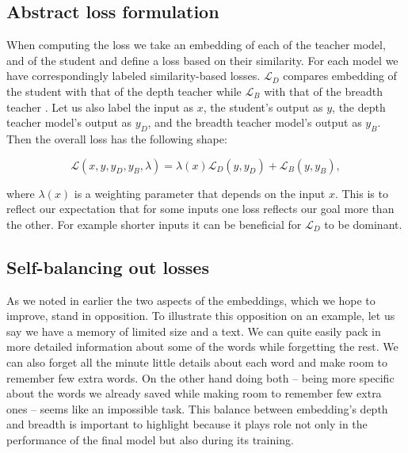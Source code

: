 \subsection{Abstract loss formulation}


When computing the loss we take an embedding of each of the teacher model, and
of the student and define a loss based on their similarity. For each model we
have correspondingly labeled similarity-based losses. $\mathcal{L}_D$ compares
embedding of the student with that of the depth teacher {\Md} while
$\mathcal{L}_B$ with that of the breadth teacher {\Mb}. Let us also label the
input as $x$, the student's output as $y$, the depth teacher model's output as
$y_D$, and the breadth teacher model's output as $y_B$. Then the overall loss
has the following shape:

\begin{equation}
  \mathcal{L}(x, y, y_D, y_B, \lambda) =
    \lambda(x) \mathcal{L}_D(y, y_D) +
            \mathcal{L}_B(y, y_B),
\end{equation}

where $\lambda(x)$ is a weighting parameter that depends on the input $x$. This
is to reflect our expectation that for some inputs one loss reflects our goal
more than the other. For example shorter inputs it can be beneficial for
$\mathcal{L}_D$ to be dominant.

\subsection{Self-balancing out losses}

As we noted in earlier the two aspects of the embeddings, which we hope to
improve, stand in opposition. To illustrate this opposition on an example, let
us say we have a memory of limited size and a text. We can quite easily pack in
more detailed information about some of the words while forgetting the rest. We
can also forget all the minute little details about each word and make room to
remember few extra words. On the other hand doing both -- being more specific
about the words we already saved while making room to remember few extra ones --
seems like an impossible task. This balance between embedding's depth and
breadth is important to highlight because it plays role not only in the
performance of the final model but also during its training.


